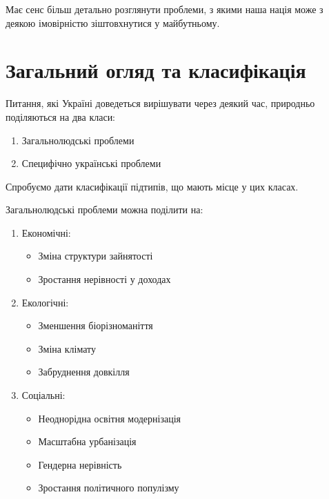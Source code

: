 
Має сенс більш детально розглянути проблеми, з якими наша нація може з деякою
імовірністю зіштовхнутися у майбутньому.

\pagestyle{plain}

\chapter{Загальний огляд та класифікація}\label{sec:general}
        Питання, які Україні доведеться вирішувати через деякий час, природньо поділяються на два класи:

        \begin{enumerate}
            \item Загальнолюдські проблеми
            \item Специфічно українські проблеми
        \end{enumerate}
        
        Спробуємо дати класифікації підтипів, що мають місце у цих класах. 

        Загальнолюдські проблеми можна поділити на:

        \begin{enumerate}
            \item Економічні:
            \begin{itemize}
                \item Зміна структури зайнятості
                \item Зростання нерівності у доходах
            \end{itemize}

            \item Екологічні:
            \begin{itemize}
                \item Зменшення біорізноманіття
                \item Зміна клімату
                \item Забруднення довкілля
            \end{itemize}

            \item Соціальні:
            \begin{itemize}
                \item Неоднорідна освітня модернізація
                \item Масштабна урбанізація
                \item Гендерна нерівність
                \item Зростання політичного популізму
            \end{itemize}
        \end{enumerate}

